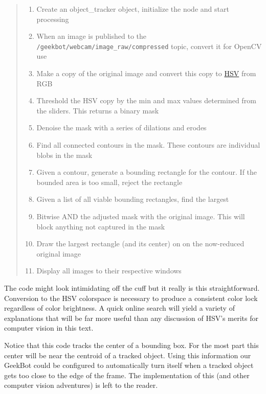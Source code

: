 \begin{quote}
\begin{enumerate}
\def\labelenumi{\arabic{enumi}.}
\tightlist
\item
  Create an object\_tracker object, initialize the node and start
  processing
\item
  When an image is published to the
  \texttt{/geekbot/webcam/image\_raw/compressed} topic, convert it for
  OpenCV use
\item
  Make a copy of the original image and convert this copy to
  \href{https://en.wikipedia.org/wiki/HSL_and_HSV}{HSV} from RGB
\item
  Threshold the HSV copy by the min and max values determined from the
  sliders. This returns a binary mask
\item
  Denoise the mask with a series of dilations and erodes
\item
  Find all connected contours in the mask. These contours are individual
  blobs in the mask
\item
  Given a contour, generate a bounding rectangle for the contour. If the
  bounded area is too small, reject the rectangle
\item
  Given a list of all viable bounding rectangles, find the largest
\item
  Bitwise AND the adjusted mask with the original image. This will block
  anything not captured in the mask
\item
  Draw the largest rectangle (and its center) on on the now-reduced
  original image
\item
  Display all images to their respective windows
\end{enumerate}
\end{quote}

The code might look intimidating off the cuff but it really is this
straightforward. Conversion to the HSV colorspace is necessary to
produce a consistent color lock regardless of color brightness. A quick
online search will yield a variety of explanations that will be far more
useful than any discussion of HSV's merits for computer vision in this
text.

Notice that this code tracks the center of a bounding box. For the most
part this center will be near the centroid of a tracked object. Using
this information our GeekBot could be configured to automatically turn
itself when a tracked object gets too close to the edge of the frame.
The implementation of this (and other computer vision adventures) is
left to the reader.
